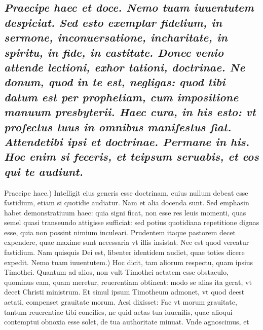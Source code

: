 \documentclass{article}
\begin{document}
\begin{pages}
\subsection*{\textit{Praecipe haec et doce. Nemo tuam iuuentutem despiciat. Sed esto exemplar fidelium, in sermone, inconuersatione, incharitate, in spiritu, in fide, in castitate. Donec venio attende lectioni, exhor tationi, doctrinae. Ne donum, quod in te est, negligas: quod tibi datum est per prophetiam, cum impositione manuum presbyterii. Haec cura, in his esto: vt profectus tuus in omnibus manifestus fiat. Attendetibi ipsi et doctrinae. Permane in his. Hoc enim si feceris, et teipsum seruabis, et eos qui te audiunt. }}\pstart Praecipe haec.) Intelligit eius generis esse doctrinam, cuius nullum debeat esse fastidium, etiam si quotidie audiatur. Nam et alia docenda sunt. Sed emphasin habet demonstratiuum haec: quia signi ficat, non esse res leuis momenti, quas semel quasi transeundo attigisse sufficiat: sed potius quotidiana repetitione dignas esse, quia non possint nimium inculeari. Prudentem itaque pastorem decet expendere, quae maxime sunt necessaria vt illis insistat. Nec est quod vereatur fastidium. Nam quisquis Dei est, libenter identidem audiet, quae toties dicere expedit.  \pend\pstart Nemo tuam iuuentutem.) Hoc dicit, tam aliorum respectu, quam ipsius Timothei. Quantum ad alios, non vult Timothei aetatem esse obstaculo, quominus eam, quam meretur, reuerentiam obtineat: modo se alias ita gerat, vt decet Christi ministrum. Et simul ipsum Timotheum admonet, vt quod deest aetati, compenset grauitate morum. Aesi dixisset: Fac vt morum grauitate, tantum reuerentiae tibi concilies, ne quid aetas tua iuuenilis, quae alioqui contemptui obnoxia esse solet, de tua authoritate minuat. Vnde agnoscimus, et  \pend

\end{pages}
\end{document}
